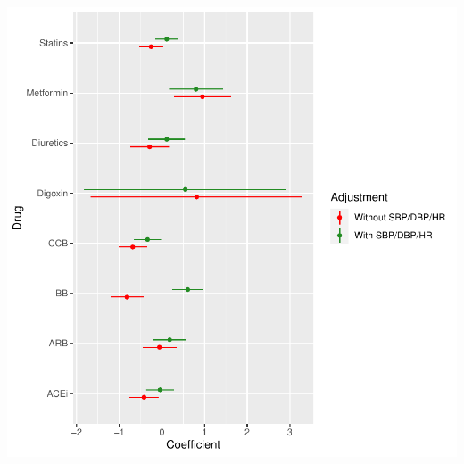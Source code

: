 \documentclass[
]{article}
\begin{document}
\includegraphics{../results/report_files/figure-latex/med-effect-forest-2-1.pdf}
\end{document}
